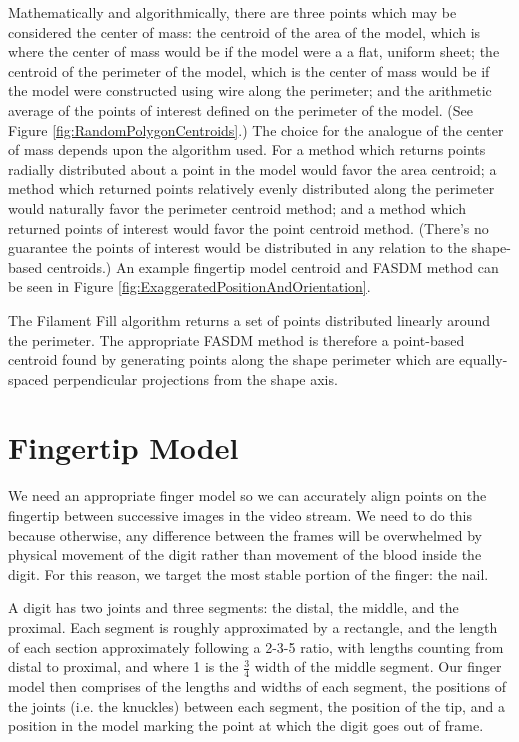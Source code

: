 Mathematically and algorithmically, there are three points which may be considered the center of mass: the centroid of the area of the model, which is where the center of mass would be if the model were a a flat, uniform sheet; the centroid of the perimeter of the model, which is the center of mass would be if the model were constructed using wire along the perimeter; and the arithmetic average of the points of interest defined on the perimeter of the model. (See Figure \ref{fig:RandomPolygonCentroids}.) The choice for the analogue of the center of mass depends upon the algorithm used. For a method which returns points radially distributed about a point in the model would favor the area centroid; a method which returned points relatively evenly distributed along the perimeter would naturally favor the perimeter centroid method; and a method which returned points of interest would favor the point centroid method. (There's no guarantee the points of interest would be distributed in any relation to the shape-based centroids.) An example fingertip model centroid and FASDM method can be seen in Figure \ref{fig:ExaggeratedPositionAndOrientation}.
 
 The Filament Fill algorithm returns a set of points distributed linearly around the perimeter. The appropriate FASDM method is therefore a point-based centroid found by generating points along the shape perimeter which are equally-spaced perpendicular projections from the shape axis.


\section{Fingertip Model}\label{sec:FingertipModel}

We need an appropriate finger model so we can accurately align points on the fingertip between successive images in the video stream. We need to do this because otherwise, any difference between the frames will be overwhelmed by physical movement of the digit rather than movement of the blood inside the digit. For this reason, we target the most stable portion of the finger: the nail.

A digit has two joints and three segments: the distal, the middle, and the proximal. Each segment is roughly approximated by a rectangle, and the length of each section approximately following a 2-3-5 ratio, with lengths counting from distal to proximal, and where 1 is the $\frac{3}{4}$ width of the middle segment. Our finger model then comprises of the lengths and widths of each segment, the positions of the joints (i.e. {\tiny {\tiny }}the knuckles) between each segment, the position of the tip, and a position in the model marking the point at which the digit goes out of frame.

